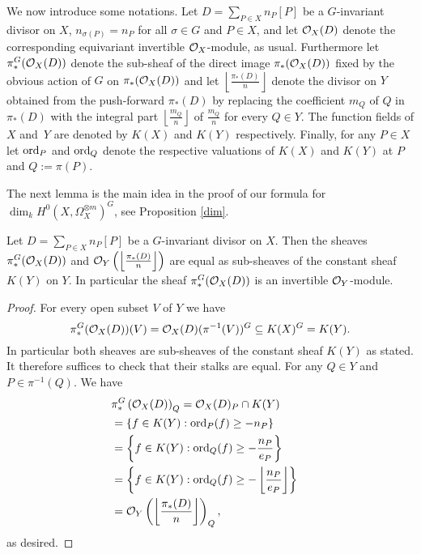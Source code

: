 We now introduce some notations. 
Let $D=\sum_{P\in X}n_P[P]$ be a $G$-invariant divisor on $X$, \ie $n_{\sigma(P)} = n_P$ for all $\sigma \in G$ and $P\in X$, and let ${\cal O}_X(D)$ denote the corresponding equivariant invertible ${\cal O}_X$-module, as usual. 
Furthermore let $\pi_*^G({\cal O}_X(D))$ denote the sub-sheaf of the direct image $\pi_*({\cal O}_X(D))$ fixed by the obvious action of $G$ on $\pi_*({\cal O}_X(D))$ and let $\left\lfloor \frac{\pi_*(D)}{n}
\right \rfloor$ denote the divisor on $Y$ obtained from the push-forward $\pi_*(D)$ by replacing the coefficient $m_Q$ of $Q$ in $\pi_*(D)$ with the integral part $\left \lfloor \frac{m_Q}{n} \right \rfloor$ of $\frac{m_Q}{n}$ for every $Q \in Y$. 
The function fields of $X$ and~$Y$ are denoted by $K(X)$ and $K(Y)$ respectively. 
Finally, for any $P \in X$ let $\operatorname{ord}_P$ and $\operatorname{ord}_Q$ denote the respective valuations of $K(X)$ and $K(Y)$ at $P$ and $Q:=\pi(P)$.



The next lemma is the main idea in the proof of our formula for $\dim_kH^0(X,\Omega_X^{\otimes m})^G$, see Proposition \ref{dim}. 



    \begin{lem}
    Let $D=\sum_{P\in X}n_P[P]$ be a $G$-invariant divisor on $X$.
    Then the sheaves $\pi_*^G({\cal O}_X(D))$ and ${\cal O}_Y\left(\left\lfloor \frac{\pi_*(D)}{n}\right \rfloor\right)$ are equal as sub-sheaves of the constant sheaf $K(Y)$ on $Y$. 
    In particular the sheaf $\pi_*^G({\cal O}_X(D))$ is an invertible ${\cal O}_Y$-module.
    \end{lem}
    \begin{proof}
    For every open subset $V$ of $Y$ we have 
        \[
        \pi_*^G({\cal O}_X(D))(V) = {\cal O}_X(D) (\pi^{-1}(V))^G \subseteq K(X)^G = K(Y).
        \]
    In particular both sheaves are sub-sheaves of the constant sheaf $K(Y)$ as stated. 
    It therefore suffices to check that their stalks are equal. 
    For any $Q \in Y$ and $P \in \pi^{-1}(Q)$.
    We have
        \begin{align*}
        \lefteqn{\pi_*^G\left(\cO_X(D)\right)_Q = \cO_X(D)_P \cap K(Y)}\\
        &= \left\{f \in K(Y): \ord_P(f) \ge -n_P\right\}\\
        &= \left\{f \in K(Y): \ord_Q(f) \ge - \frac{n_P}{e_P}\right\}\\
        &= \left\{ f \in K(Y): \ord_Q(f) \ge - \left\lfloor\frac{n_P}{e_P} \right\rfloor \right\}\\
        &= \cO_Y\left(\left\lfloor \frac{\pi_*(D)}{n} \right\rfloor\right)_Q,
        \end{align*}
    as desired.
    \end{proof}

